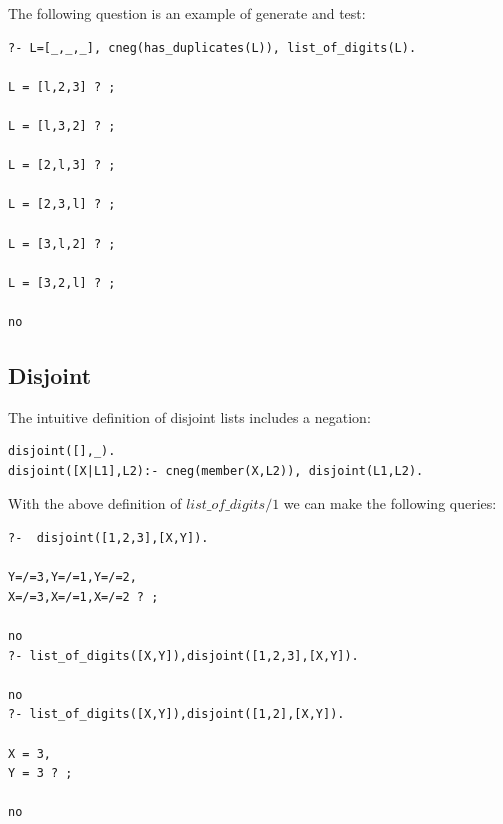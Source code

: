 \documentclass{tlp}
\begin{document}
The following question is an example of generate and test:
\begin{small}
\begin{verbatim}
?- L=[_,_,_], cneg(has_duplicates(L)), list_of_digits(L).

L = [l,2,3] ? ;

L = [l,3,2] ? ;

L = [2,l,3] ? ;

L = [2,3,l] ? ;

L = [3,l,2] ? ;

L = [3,2,l] ? ;

no
\end{verbatim}
\end{small}

\subsection*{Disjoint}

The intuitive definition of disjoint lists includes a negation:
\begin{small}
\begin{verbatim}
disjoint([],_).
disjoint([X|L1],L2):- cneg(member(X,L2)), disjoint(L1,L2).
\end{verbatim}
\end{small}

With the above definition of $list\_of\_digits/1$ we can make the following
queries: 
\begin{small}
\begin{verbatim}
?-  disjoint([1,2,3],[X,Y]).

Y=/=3,Y=/=1,Y=/=2,
X=/=3,X=/=1,X=/=2 ? ;

no
?- list_of_digits([X,Y]),disjoint([1,2,3],[X,Y]).

no
?- list_of_digits([X,Y]),disjoint([1,2],[X,Y]).

X = 3,
Y = 3 ? ;

no
\end{verbatim}
\end{small}
\end{document}
